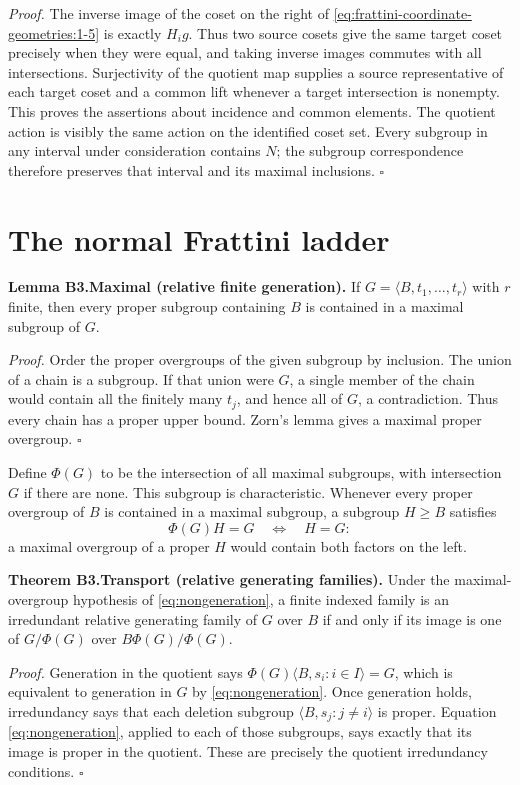 \emph{Proof.} The inverse image of the coset on the right of \eqref{eq:frattini-coordinate-geometries:1-5} is exactly \(H_i g\). Thus two source cosets give the same target coset precisely when they were equal, and taking inverse images commutes with all intersections. Surjectivity of the quotient map supplies a source representative of each target coset and a common lift whenever a target intersection is nonempty. This proves the assertions about incidence and common elements. The quotient action is visibly the same action on the identified coset set. Every subgroup in any interval under consideration contains \(N\); the subgroup correspondence therefore preserves that interval and its maximal inclusions. \(\square\)
\section{The normal Frattini ladder}
\textbf{Lemma B3.Maximal (relative finite generation).} If \(G=\langle B,t_1,\ldots,t_r\rangle\) with \(r\) finite, then every proper subgroup containing \(B\) is contained in a maximal subgroup of \(G\).

\emph{Proof.} Order the proper overgroups of the given subgroup by inclusion. The union of a chain is a subgroup. If that union were \(G\), a single member of the chain would contain all the finitely many \(t_j\), and hence all of \(G\), a contradiction. Thus every chain has a proper upper bound. Zorn's lemma gives a maximal proper overgroup. \(\square\)

Define \(\Phi(G)\) to be the intersection of all maximal subgroups, with intersection \(G\) if there are none. This subgroup is characteristic. Whenever every proper overgroup of \(B\) is contained in a maximal subgroup, a subgroup \(H\geq B\) satisfies \begin{equation}
\Phi(G)H=G\quad\Longleftrightarrow\quad H=G:
\label{eq:nongeneration}
\end{equation} a maximal overgroup of a proper \(H\) would contain both factors on the left.

\textbf{Theorem B3.Transport (relative generating families).} Under the maximal-overgroup hypothesis of \eqref{eq:nongeneration}, a finite indexed family is an irredundant relative generating family of \(G\) over \(B\) if and only if its image is one of \(G/\Phi(G)\) over \(B\Phi(G)/\Phi(G)\).

\emph{Proof.} Generation in the quotient says \(\Phi(G)\langle B,s_i:i\in I\rangle=G\), which is equivalent to generation in \(G\) by \eqref{eq:nongeneration}. Once generation holds, irredundancy says that each deletion subgroup \(\langle B,s_j:j\ne i\rangle\) is proper. Equation \eqref{eq:nongeneration}, applied to each of those subgroups, says exactly that its image is proper in the quotient. These are precisely the quotient irredundancy conditions. \(\square\)

